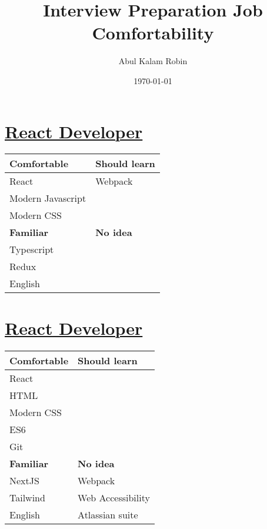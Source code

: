 \documentclass[11pt]{article}
\author{Abul Kalam Robin}
\date{\today}
\title{Interview Preparation Job Comfortability}
\begin{document}
\maketitle

\section{\href{https://remoteok.io/remote-jobs/103827-remote-react-developer-rebelcode-ltd}{React Developer}}
\label{sec:org86e19f0}
\begin{center}
\begin{tabular}{|l|l|}
\hline
\textbf{Comfortable} & \textbf{Should learn}\\
\hline
React & Webpack\\
Modern Javascript & \\
Modern CSS & \\
\hline
\textbf{Familiar} & \textbf{No idea}\\
\hline
Typescript & \\
Redux & \\
English & \\
\hline
\end{tabular}
\end{center}

\section{\href{https://www.indeed.com/viewjob?jk=b72e707d06663e2b\&tk=1f6m8e16vo25e801\&from=serp\&vjs=3}{React Developer}}
\label{sec:org3b62b0f}
\begin{center}
\begin{tabular}{|l|l|}
\hline
\textbf{Comfortable} & \textbf{Should learn}\\
\hline
React & \\
HTML & \\
Modern CSS & \\
ES6 & \\
Git & \\
\hline
\textbf{Familiar} & \textbf{No idea}\\
\hline
NextJS & Webpack\\
Tailwind & Web Accessibility\\
English & Atlassian suite\\
\hline
\end{tabular}
\end{center}
\end{document}
